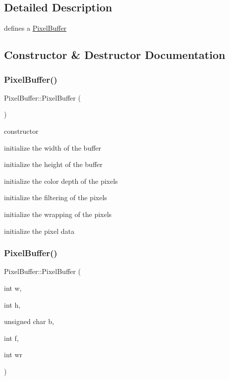 \subsection{Detailed Description}
defines a \hyperlink{struct_pixel_buffer}{Pixel\+Buffer} 

\subsection{Constructor \& Destructor Documentation}
\mbox{\label{struct_pixel_buffer_aa1d5199f80acc1c154a289b4519a7b97}} 
\subsubsection{\texorpdfstring{Pixel\+Buffer()}{PixelBuffer()}\hspace{0.1cm}{\footnotesize\ttfamily [1/2]}}
{\footnotesize\ttfamily Pixel\+Buffer\+::\+Pixel\+Buffer (\begin{DoxyParamCaption}{ }\end{DoxyParamCaption})\hspace{0.3cm}{\ttfamily [inline]}}



constructor 

initialize the width of the buffer

initialize the height of the buffer

initialize the color depth of the pixels

initialize the filtering of the pixels

initialize the wrapping of the pixels

initialize the pixel data \mbox{\label{struct_pixel_buffer_ada8b571a542bdd0be9cbe29116aac7c8}} 
\subsubsection{\texorpdfstring{Pixel\+Buffer()}{PixelBuffer()}\hspace{0.1cm}{\footnotesize\ttfamily [2/2]}}
{\footnotesize\ttfamily Pixel\+Buffer\+::\+Pixel\+Buffer (\begin{DoxyParamCaption}\item[{int}]{w,  }\item[{int}]{h,  }\item[{unsigned char}]{b,  }\item[{int}]{f,  }\item[{int}]{wr }\end{DoxyParamCaption})\hspace{0.3cm}{\ttfamily [inline]}}



